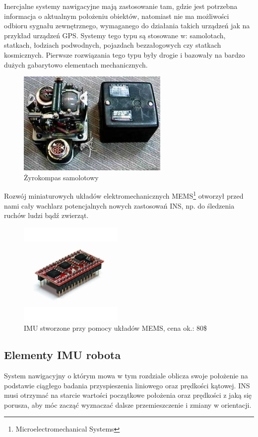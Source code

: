 Inercjalne systemy nawigacyjne mają zastosowanie tam, gdzie jest potrzebna
informacja o aktualnym położeniu obiektów, natomiast nie ma możliwości odbioru
sygnału zewnętrznego, wymaganego do działania takich urządzeń jak na przykład urządzeń GPS. 
Systemy tego typu są stosowane w: samolotach, statkach, łodziach podwodnych, pojazdach
bezzałogowych czy statkach kosmicznych. Pierwsze rozwiązania tego typu były drogie i bazowały na bardzo
dużych gabarytowo elementach mechanicznych. 
\begin{figure}[!ht]
 \centering
 \includegraphics[height=50mm]{../images/ch04/gyrocompass.jpg}
 \caption[Żyrokompas samolotowy]{Żyrokompas samolotowy\footnotemark}
 \label{fig:ZyrokompasSamolotowy}
\end{figure}

Rozwój miniaturowych układów elektromechanicznych MEMS\footnote{Microelectromechanical Systems} otworzył przed nami cały
wachlarz potencjalnych nowych zastosowań INS, np. do śledzenia ruchów ludzi bądź
zwierząt.

\begin{figure}[!ht]
 \centering
 \includegraphics[height=50mm]{../images/ch04/mems_imu.jpg}
 \caption[IMU stworzone przy pomocy układów MEMS]{IMU stworzone przy pomocy układów MEMS, cena ok.: 80\$\footnotemark}
 \label{fig:IMUMEMS}
\end{figure}

\subsection{Elementy IMU robota}
System nawigacyjny o którym mowa w tym rozdziale oblicza swoje położenie na
podstawie ciągłego badania przyspieszenia liniowego oraz prędkości kątowej. INS
musi otrzymać na starcie wartości początkowe położenia oraz prędkości z jaką się
porusza, aby móc zacząć wyznaczać dalsze przemieszczenie i zmiany w orientacji.

